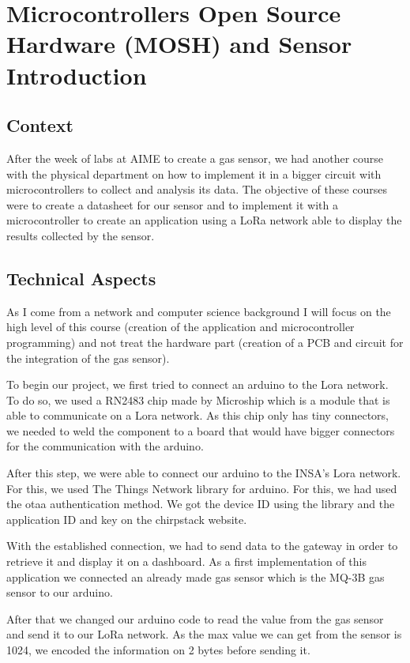 \section{Microcontrollers Open Source Hardware (MOSH) and Sensor Introduction}

\subsection{Context}

After the week of labs at AIME to create a gas sensor, we had another course with the physical department on how to implement it in a bigger circuit with microcontrollers to collect and analysis its data. The objective of these courses were to create a datasheet for our sensor and to implement it with a microcontroller to create an application using a LoRa network able to display the results collected by the sensor.  

\subsection{Technical Aspects}

As I come from a network and computer science background I will focus on the high level of this course (creation of the application and microcontroller programming) and not treat the hardware part (creation of a PCB and circuit for the integration of the gas sensor).
\\\par

To begin our project, we first tried to connect an arduino to the Lora network. To do so, we used a RN2483 chip made by Microship which is a module that is able to communicate on a Lora network. As this chip only has tiny connectors, we needed to weld the component to a board that would have bigger connectors for the communication with the arduino.
\par
After this step, we were able to connect our arduino to the INSA's Lora network. For this, we used The Things Network library for arduino. For this, we had used the otaa authentication method. We got the device ID using the library and the application ID and key on the chirpstack website.
\par
With the established connection, we had to send data to the gateway in order to retrieve it and display it on a dashboard. As a first implementation of this application we connected an already made gas sensor which is the MQ-3B gas sensor to our arduino.
\par
After that we changed our arduino code to read the value from the gas sensor and send it to our LoRa network. As the max value we can get from the sensor is 1024, we encoded the information on 2 bytes before sending it.
\\\par

